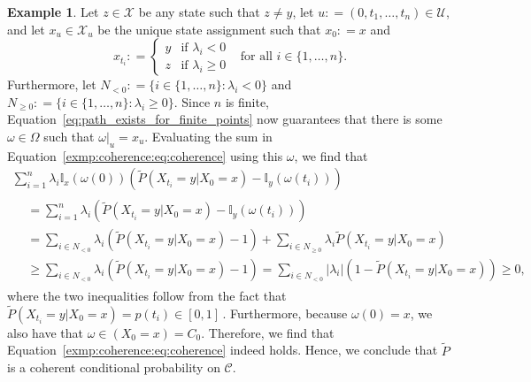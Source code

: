 \documentclass[10pt,a4paper]{paper}
\theoremstyle{definition}
\newtheorem{exmp}{Example}%
\newcommand{\states}{\mathcal{X}}
\newcommand{\ind}[1]{\mathbb{I}_{#1}}
\newcommand{\abs}[1]{\left\vert #1 \right\vert}
\newcommand{\coloneqq}{:\!=}
\begin{document}
\begin{exmp}
Let $z\in\states$ be any state such that $z\neq y$, let $u\coloneqq(0,t_1,\ldots,t_n)\in\mathcal{U}$, and let $x_u\in\states_u$ be the unique state assignment such that $x_{0}\coloneqq x$ and
\begin{equation*}
x_{t_i}\coloneqq
\begin{cases}
y & \text{if $\lambda_i<0$} \\
z & \text{if $\lambda_i\geq0$}
\end{cases}
~~\text{ for all $i\in\{1,\ldots,n\}$.}
\end{equation*}
Furthermore, let $N_{<0}\coloneqq\{i\in\{1,\dots,n\}\colon \lambda_i<0\}$ and $N_{\geq0}\coloneqq\{i\in\{1,\dots,n\}\colon \lambda_i\geq0\}$.
Since $n$ is finite, Equation~\eqref{eq:path_exists_for_finite_points} now guarantees that there is some $\omega\in\Omega$ such that $\omega\vert_{u}=x_u$. Evaluating the sum in Equation~\eqref{exmp:coherence:eq:coherence} using this $\omega$, we find that
\begin{multline*}
 \sum_{i=1}^n \lambda_{i}\ind{x}(\omega(0))\left(\tilde{P}(X_{t_i}=y\vert X_0=x) - \ind{y}(\omega(t_i))\right)\\[-4pt]
 \begin{aligned}
 &= \sum_{i=1}^n \lambda_{i}\left(\tilde{P}(X_{t_i}=y\vert X_0=x) - \ind{y}(\omega(t_i))\right) \\
 &= \sum_{i\in N_{<0}}\lambda_{i}\left(\tilde{P}(X_{t_i}=y\vert X_0=x) - 1\right) + \sum_{i\in N_{\geq0}}\lambda_{i}\tilde{P}(X_{t_i}=y\vert X_0=x) \\
 &\geq \sum_{i\in N_{<0}}\lambda_{i}\left(\tilde{P}(X_{t_i}=y\vert X_0=x) - 1\right) = \sum_{i\in N_{<0}}\abs{\lambda_{i}}\left(1 - \tilde{P}(X_{t_i}=y\vert X_0=x)\right) \geq 0,
 \end{aligned}
\end{multline*}
where the two inequalities follow from the fact that $\tilde{P}(X_{t_i}=y\vert X_0=x)=p(t_i)\in [0,1]$\,.
Furthermore, because $\omega(0)=x$, we also have that $\omega\in (X_0=x)=C_0$. Therefore, we find that Equation~\eqref{exmp:coherence:eq:coherence} indeed holds. Hence, we conclude that $\tilde{P}$ is a coherent conditional probability on $\mathcal{C}$.


\end{exmp}
\end{document}
